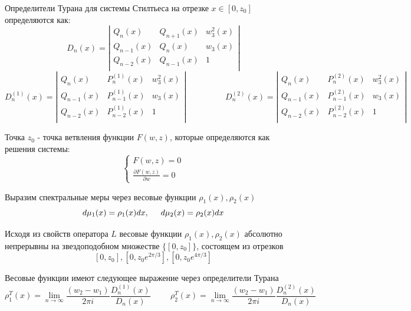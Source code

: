 \documentclass{report}
\begin{document}
Определители Турана для системы Стилтьеса на отрезке $x\in [0,z_0]$ определяются как: 
$$
D_n(x)=\left| \begin{array}{ccccccc}
Q_n(x) & Q_{n+1}(x) & w_3^2(x)\\
Q_{n-1}(x) & Q_{n}(x) & w_3(x)\\
Q_{n-2}(x) & Q_{n-1}(x) & 1\\
\end{array}
\right|
$$
$$
D^{(1)}_n(x)=\left| \begin{array}{ccccccc}
Q_n(x) & P^{(1)}_{n}(x) & w_3^2(x)\\
Q_{n-1}(x) & P^{(1)}_{n-1}(x) & w_3(x)\\
Q_{n-2}(x) & P^{(1)}_{n-2}(x) & 1\\
\end{array}
\right| \hspace{2cm}
D^{(2)}_n(x)=\left| \begin{array}{ccccccc}
Q_n(x) & P^{(2)}_{n}(x) & w_3^2(x)\\
Q_{n-1}(x) & P^{(2)}_{n-1}(x) & w_3(x)\\
Q_{n-2}(x) & P^{(2)}_{n-2}(x) & 1\\
\end{array}
\right|
$$

Точка $z_0$ - точка ветвления функции $F(w,z)$, которые определяются как решения системы:
\begin{equation}
\left\{
\begin{array}{lllll}
F(w,z)=0 \\
\displaystyle \frac{\partial F(w,z)}{\partial w} = 0
\end{array}
\right.
\end{equation}  

Выразим спектральные меры через весовые функции $\rho_1(x), \rho_2(x)$
$$
d\mu_1(x)=\rho_1(x)dx, \hspace{0.5 cm} d\mu_2(x)=\rho_2(x)dx
$$

Исходя из свойств оператора $L$ весовые функции $\rho_1(x), \rho_2(x)$ абсолютно непрерывны на звездоподобном множестве $\{[0,z_0]\}$, состоящем из отрезков
$$
[0,z_0], [0,z_0 e^{2\pi/3}], [0,z_0 e^{4\pi/3}]
$$

Весовые функции имеют следующее выражение через определители Турана 
\begin{equation}
\rho_1^T(x)= \lim_{n\rightarrow \infty} \displaystyle \frac {(w_2-w_1)}{2\pi i} \frac{D^{(1)}_n(x)}{D_n(x)} \hspace{1cm}
\rho_2^T(x)= \lim_{n\rightarrow \infty} \displaystyle \frac {(w_2-w_1)}{2\pi i} \frac{D^{(2)}_n(x)}{D_n(x)} 
\end{equation}
\end{document}
